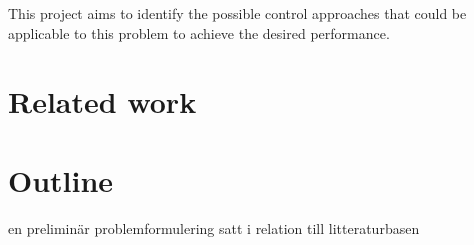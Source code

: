 This project aims to identify the possible control approaches that could be applicable to this problem to achieve the desired performance.

\section{Related work}

\section{Outline}

en preliminär problemformulering satt i relation till litteraturbasen
